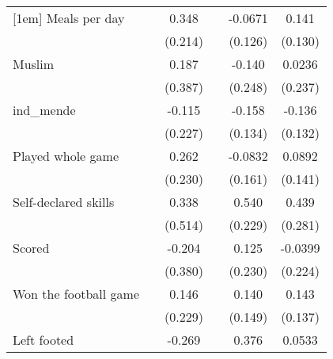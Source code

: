 {\begin{tabular}{l*{5}{c}}
[1em]
Meals per day       &                     &       0.348         &                     &     -0.0671         &       0.141         \\
                    &                     &     (0.214)         &                     &     (0.126)         &     (0.130)         \\
[1em]
Muslim              &                     &       0.187         &                     &      -0.140         &      0.0236         \\
                    &                     &     (0.387)         &                     &     (0.248)         &     (0.237)         \\
[1em]
ind\_mende           &                     &      -0.115         &                     &      -0.158         &      -0.136         \\
                    &                     &     (0.227)         &                     &     (0.134)         &     (0.132)         \\
[1em]
Played whole game   &                     &       0.262         &                     &     -0.0832         &      0.0892         \\
                    &                     &     (0.230)         &                     &     (0.161)         &     (0.141)         \\
[1em]
Self-declared skills&                     &       0.338         &                     &       0.540\sym{**} &       0.439         \\
                    &                     &     (0.514)         &                     &     (0.229)         &     (0.281)         \\
[1em]
Scored              &                     &      -0.204         &                     &       0.125         &     -0.0399         \\
                    &                     &     (0.380)         &                     &     (0.230)         &     (0.224)         \\
[1em]
Won the football game&                     &       0.146         &                     &       0.140         &       0.143         \\
                    &                     &     (0.229)         &                     &     (0.149)         &     (0.137)         \\
[1em]
Left footed         &                     &      -0.269         &                     &       0.376         &      0.0533         \\

\end{tabular}}
